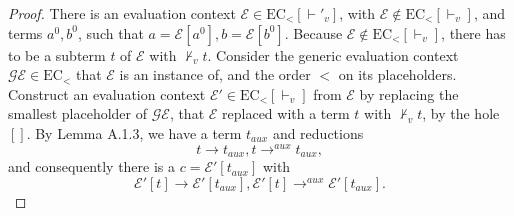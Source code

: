 \compl*
\begin{proof}

There is an evaluation context $\mathcal{E} \in \textrm{EC}_<[\vdash'_v]$, with $\mathcal{E} \not\in \textrm{EC}_<[\vdash_v]$, and terms $a^0, b^0$, such that $a = \mathcal{E}[a^0], b = \mathcal{E}[b^0]$. Because $\mathcal{E} \not\in \textrm{EC}_<[\vdash_v]$, there has to be a subterm $t$ of $\mathcal{E}$ with $\not\vdash_v t$. Consider the generic evaluation context $\mathcal{GE} \in \textrm{EC}_<$ that $\mathcal{E}$ is an instance of, and the order $<$ on its placeholders. Construct an evaluation context $\mathcal{E}' \in \textrm{EC}_<[\vdash_v]$ from $\mathcal{E}$ by replacing the smallest placeholder of $\mathcal{GE}$, that $\mathcal{E}$ replaced with a term $t$ with $\not\vdash_v t$, by the hole $[]$. By Lemma A.1.3, we have a term $t_{aux}$ and reductions
\[
t \longrightarrow t_{aux}, t \longrightarrow^{aux} t_{aux},
\]
and consequently there is a $c = \mathcal{E}'[t_{aux}]$ with
\[
\mathcal{E}'[t] \longrightarrow \mathcal{E}'[t_{aux}], \mathcal{E}'[t] \longrightarrow^{aux} \mathcal{E}'[t_{aux}].
\]

\end{proof}

